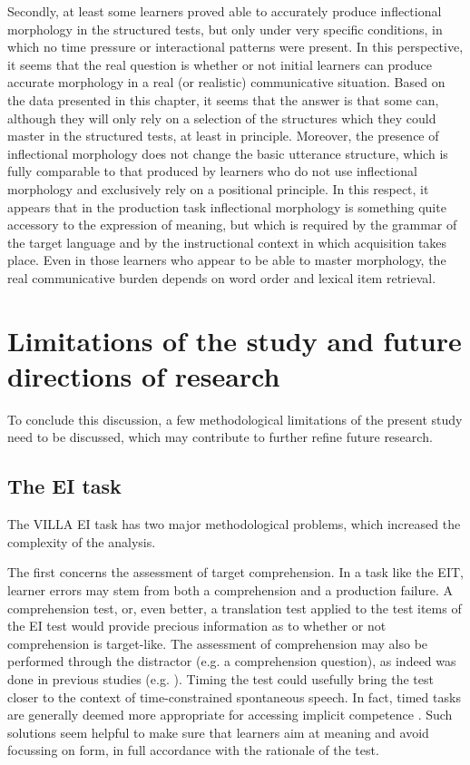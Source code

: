 Secondly, at least some learners proved able to accurately produce inflectional morphology in the structured tests, but only under very specific conditions, in which no time pressure or interactional patterns were present. In this perspective, it seems that the real question is whether or not initial learners can produce accurate morphology in a real (or realistic) communicative situation. Based on the data presented in this chapter, it seems that the answer is that some can, although they will only rely on a selection of the structures which they could master in the structured tests, at least in principle. Moreover, the presence of inflectional morphology does not change the basic utterance structure, which is fully comparable to that produced by learners who do not use inflectional morphology and exclusively rely on a positional principle. In this respect, it appears that in the production task inflectional morphology is something quite accessory to the expression of meaning, but which is required by the grammar of the target language and by the instructional context in which acquisition takes place. Even in those learners who appear to be able to master morphology, the real communicative burden depends on word order and lexical item retrieval.

\section{Limitations of the study and future directions of research}\label{sec:08:6}

To conclude this discussion, a few methodological limitations of the present study need to be discussed, which may contribute to further refine future research. 

\subsection{The EI task}\label{sec:08:6.1}

The VILLA EI task has two major methodological problems, which increased the complexity of the analysis.

The first concerns the assessment of target comprehension. In a task like the EIT, learner errors may stem from both a comprehension and a production failure. A comprehension test, or, even better, a translation test applied to the test items of the EI test would provide precious information as to whether or not comprehension is target-like. The assessment of comprehension may also be performed through the distractor (e.g. a comprehension question), as indeed was done in previous studies (e.g. \citealt{Erlam2006}). Timing the test could usefully bring the test closer to the context of time-constrained spontaneous speech. In fact, timed tasks are generally deemed more appropriate for accessing implicit competence \citep{Ellis2005}. Such solutions seem helpful to make sure that learners aim at meaning and avoid focussing on form, in full accordance with the rationale of the test.

